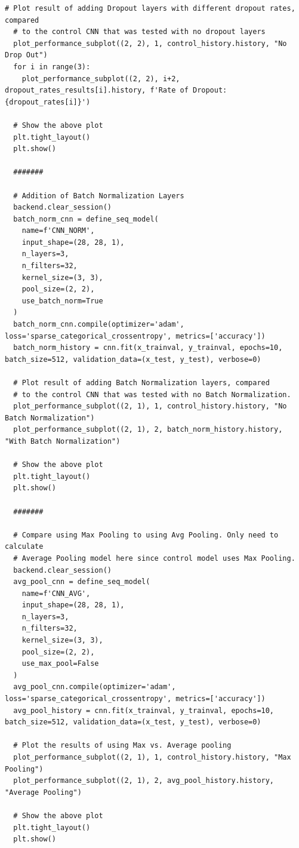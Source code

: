 \documentclass[a4paper]{article}
\begin{document}
\begin{lstlisting}[basicstyle= \scriptsize]
  # Plot result of adding Dropout layers with different dropout rates, compared
  # to the control CNN that was tested with no dropout layers
  plot_performance_subplot((2, 2), 1, control_history.history, "No Drop Out")
  for i in range(3):
    plot_performance_subplot((2, 2), i+2, dropout_rates_results[i].history, f'Rate of Dropout: {dropout_rates[i]}')

  # Show the above plot
  plt.tight_layout()
  plt.show()

  #######

  # Addition of Batch Normalization Layers 
  backend.clear_session()
  batch_norm_cnn = define_seq_model(
    name=f'CNN_NORM',
    input_shape=(28, 28, 1),
    n_layers=3,
    n_filters=32,
    kernel_size=(3, 3),
    pool_size=(2, 2),
    use_batch_norm=True
  )
  batch_norm_cnn.compile(optimizer='adam', loss='sparse_categorical_crossentropy', metrics=['accuracy'])
  batch_norm_history = cnn.fit(x_trainval, y_trainval, epochs=10, batch_size=512, validation_data=(x_test, y_test), verbose=0)
    
  # Plot result of adding Batch Normalization layers, compared
  # to the control CNN that was tested with no Batch Normalization.
  plot_performance_subplot((2, 1), 1, control_history.history, "No Batch Normalization")
  plot_performance_subplot((2, 1), 2, batch_norm_history.history, "With Batch Normalization")

  # Show the above plot
  plt.tight_layout()
  plt.show()

  #######

  # Compare using Max Pooling to using Avg Pooling. Only need to calculate
  # Average Pooling model here since control model uses Max Pooling.
  backend.clear_session()
  avg_pool_cnn = define_seq_model(
    name=f'CNN_AVG',
    input_shape=(28, 28, 1),
    n_layers=3,
    n_filters=32,
    kernel_size=(3, 3),
    pool_size=(2, 2),
    use_max_pool=False
  )
  avg_pool_cnn.compile(optimizer='adam', loss='sparse_categorical_crossentropy', metrics=['accuracy'])
  avg_pool_history = cnn.fit(x_trainval, y_trainval, epochs=10, batch_size=512, validation_data=(x_test, y_test), verbose=0)

  # Plot the results of using Max vs. Average pooling
  plot_performance_subplot((2, 1), 1, control_history.history, "Max Pooling")
  plot_performance_subplot((2, 1), 2, avg_pool_history.history, "Average Pooling")

  # Show the above plot
  plt.tight_layout()
  plt.show()


\end{lstlisting}
\end{document}
